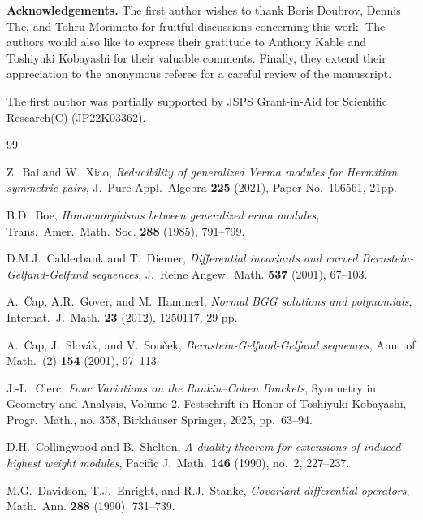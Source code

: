 \documentclass[reqno,11pt]{amsart}
\theoremstyle{remark}
\numberwithin{equation}{section}
\begin{document}
\noindent
\textbf{Acknowledgements.}
The first author wishes to thank Boris Doubrov, Dennis The, and Tohru Morimoto 
for fruitful discussions concerning this work.
The authors would also like to express their gratitude to 
Anthony Kable and Toshiyuki Kobayashi for their valuable comments.
Finally, they extend their appreciation to the anonymous referee 
 for a careful review of the manuscript.

The first author was partially supported by JSPS
Grant-in-Aid for Scientific Research(C) (JP22K03362).



\begin{thebibliography}{99}

Z.~Bai and W.~Xiao, \emph{{Reducibility of generalized Verma modules for
  Hermitian symmetric pairs}}, J.\ Pure Appl.\ Algebra \textbf{225} (2021),
  Paper No.\ 106561, 21pp.

B.D.~Boe, \emph{Homomorphisms between generalized erma modules},
  Trans.~Amer.~Math.~Soc. \textbf{288} (1985), 791--799.

D.M.J.~Calderbank and T.~Diemer, \emph{{Differential invariants and curved
  Bernstein-Gelfand-Gelfand sequences}}, J.\ Reine Angew.\ Math. \textbf{537}
  (2001), 67--103.

A.~{\v C}ap, A.R.~Gover, and M.~Hammerl, \emph{{Normal BGG solutions and
  polynomials}}, Internat.\ J.\ Math. \textbf{23} (2012), 1250117, 29 pp.

A.~{\v C}ap, J.~Slov{\' a}k, and V.~Sou{\v c}ek,
  \emph{{Bernstein-Gelfand-Gelfand sequences}}, Ann.\ of Math.\ (2)
  \textbf{154} (2001), 97--113.

J.-L.~Clerc, \emph{{Four Variations on the Rankin–Cohen Brackets}}, Symmetry
  in Geometry and Analysis, Volume 2, Festschrift in Honor of Toshiyuki
  Kobayashi, Progr.~Math., no. 358, Birkh\"auser Springer, 2025, pp.~63--94.

D.H.~Collingwood and B.~Shelton, \emph{{A duality theorem for extensions of
  induced highest weight modules}}, Pacific J.\ Math. \textbf{146} (1990),
  no.~2, 227--237.

M.G.~Davidson, T.J.~Enright, and R.J.~Stanke, \emph{{Covariant differential
  operators}}, Math.\ Ann. \textbf{288} (1990), 731--739.


\end{thebibliography}
\end{document}
